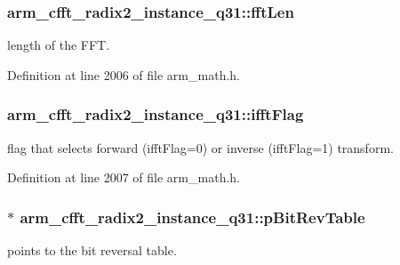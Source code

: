 \hypertarget{structarm__cfft__radix2__instance__q31_a960199f1373a192366878ef279eab00f}{
\subsubsection[{fft\-Len}]{ arm\-\_\-cfft\-\_\-radix2\-\_\-instance\-\_\-q31\-::fft\-Len}}\label{structarm__cfft__radix2__instance__q31_a960199f1373a192366878ef279eab00f}
length of the F\-F\-T. 

Definition at line 2006 of file arm\-\_\-math.\-h.

\hypertarget{structarm__cfft__radix2__instance__q31_a2607378ce64be16698bb8a3b1af8d3c8}{
\subsubsection[{ifft\-Flag}]{ arm\-\_\-cfft\-\_\-radix2\-\_\-instance\-\_\-q31\-::ifft\-Flag}}\label{structarm__cfft__radix2__instance__q31_a2607378ce64be16698bb8a3b1af8d3c8}
flag that selects forward (ifft\-Flag=0) or inverse (ifft\-Flag=1) transform. 

Definition at line 2007 of file arm\-\_\-math.\-h.

\hypertarget{structarm__cfft__radix2__instance__q31_ada8e5264f4b22ff4c621817978994674}{
\subsubsection[{p\-Bit\-Rev\-Table}]{$\ast$ arm\-\_\-cfft\-\_\-radix2\-\_\-instance\-\_\-q31\-::p\-Bit\-Rev\-Table}}\label{structarm__cfft__radix2__instance__q31_ada8e5264f4b22ff4c621817978994674}
points to the bit reversal table. 

